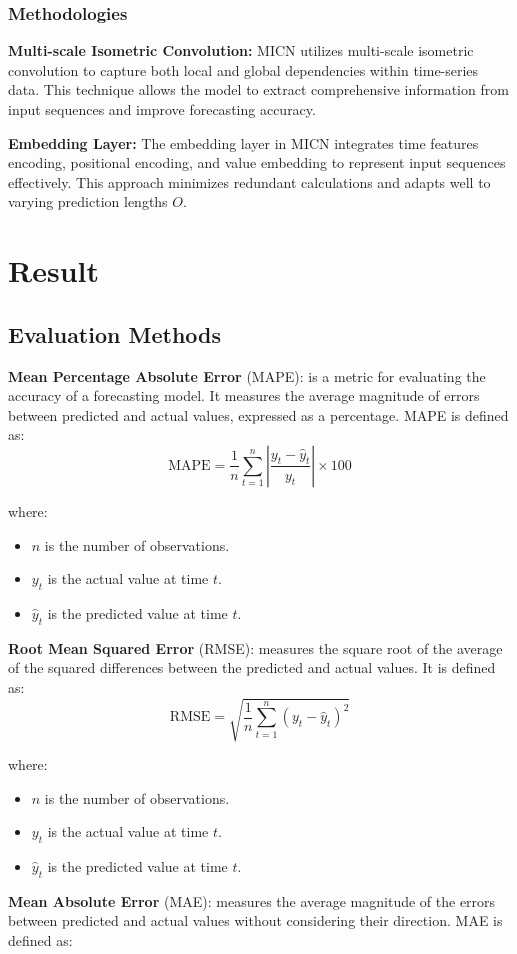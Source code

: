 \documentclass{ieeeojies}
\begin{document}
\subsubsection{Methodologies}

\textbf{Multi-scale Isometric Convolution:} MICN utilizes multi-scale isometric convolution to capture both local and global dependencies within time-series data. This technique allows the model to extract comprehensive information from input sequences and improve forecasting accuracy.

\noindent \textbf{Embedding Layer:} The embedding layer in MICN integrates time features encoding, positional encoding, and value embedding to represent input sequences effectively. This approach minimizes redundant calculations and adapts well to varying prediction lengths \( O \).

\section{Result}
\subsection{Evaluation Methods}
\textbf{Mean Percentage Absolute Error} (MAPE): is a metric for evaluating the accuracy of a forecasting model. It measures the average magnitude of errors between predicted and actual values, expressed as a percentage. MAPE is defined as:\\
\[
\text{MAPE} = \frac{1}{n} \sum_{t=1}^{n} \left| \frac{y_t - \hat{y}_t}{y_t} \right| \times 100
\]

where:
\begin{itemize}
    \item \( n \) is the number of observations.
    \item \( y_t \) is the actual value at time \( t \).
    \item \( \hat{y}_t \) is the predicted value at time \( t \).
\end{itemize}
\textbf{Root Mean Squared Error} (RMSE): measures the square root of the average of the squared differences between the predicted and actual values. It is defined as:\\
\[
\text{RMSE} = \sqrt{\frac{1}{n} \sum_{t=1}^{n} (y_t - \hat{y}_t)^2}
\]

where:
\begin{itemize}
    \item \( n \) is the number of observations.
    \item \( y_t \) is the actual value at time \( t \).
    \item \( \hat{y}_t \) is the predicted value at time \( t \).
\end{itemize}
\textbf{Mean Absolute Error} (MAE): measures the average magnitude of the errors between predicted and actual values without considering their direction. MAE is defined as:\\
\end{document}
